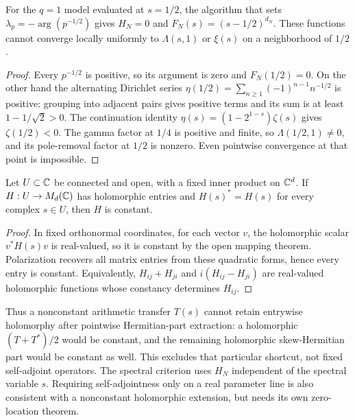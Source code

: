 \begin{proposition}\label{prop:diagonal}
For the $q=1$ model evaluated at $s=1/2$, the algorithm that sets
$\lambda_p=-\arg(p^{-1/2})$ gives $H_N=0$ and
$F_N(s)=(s-1/2)^{d_N}$. These functions cannot converge locally uniformly
to $\Lambda(s,1)$ or $\xi(s)$ on a neighborhood of $1/2$.
\end{proposition}
\begin{proof}
Every $p^{-1/2}$ is positive, so its argument is zero and $F_N(1/2)=0$.
On the other hand the alternating Dirichlet series
$\eta(1/2)=\sum_{n\ge1}(-1)^{n-1}n^{-1/2}$ is positive: grouping into
adjacent pairs gives positive terms and its sum is at least
$1-1/\sqrt2>0$. The continuation identity
$\eta(s)=(1-2^{1-s})\zeta(s)$ gives $\zeta(1/2)<0$.
The gamma factor at $1/4$ is positive and finite, so
$\Lambda(1/2,1)\ne0$, and its pole-removal factor at $1/2$ is nonzero.
Even pointwise convergence at that point is impossible.
\end{proof}

\begin{proposition}\label{prop:hermitian-rigidity}
Let $U\subset\mathbb C$ be connected and open, with a fixed inner product on
$\mathbb C^d$. If $H:U\to M_d(\mathbb C)$ has holomorphic entries and
$H(s)^*=H(s)$ for every complex $s\in U$, then $H$ is constant.
\end{proposition}
\begin{proof}
In fixed orthonormal coordinates, for each vector $v$, the holomorphic
scalar $v^*H(s)v$ is real-valued,
so it is constant by the open mapping theorem. Polarization recovers all
matrix entries from these quadratic forms, hence every entry is constant.
Equivalently, $H_{ij}+H_{ji}$ and $i(H_{ij}-H_{ji})$ are real-valued
holomorphic functions whose constancy determines $H_{ij}$.
\end{proof}
Thus a nonconstant arithmetic transfer $T(s)$ cannot retain entrywise
holomorphy after pointwise Hermitian-part extraction: a holomorphic
$(T+T^*)/2$ would be constant, and the remaining holomorphic skew-Hermitian
part would be constant as well. This excludes that particular shortcut,
not fixed self-adjoint operators. The spectral criterion uses $H_N$
independent of the spectral variable $s$. Requiring self-adjointness only
on a real parameter line is also consistent with a nonconstant holomorphic
extension, but needs its own zero-location theorem.

